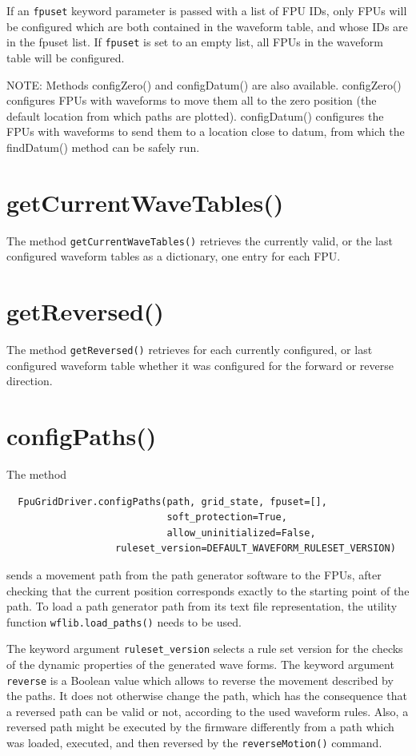 \documentclass[fontsize=12,a4paper]{scrreprt}
\begin{document}
If an \texttt{fpuset} keyword parameter is passed with a list of FPU
IDs, only FPUs will be configured which are both contained in the
waveform table, and whose IDs are in the fpuset list. If
\texttt{fpuset} is set to an empty list, all FPUs in the waveform
table will be configured.

NOTE: Methods configZero() and configDatum() are also available.
configZero() configures FPUs with waveforms to move them all to the
zero position (the default location from which paths are plotted).
configDatum() configures the FPUs with waveforms to send them to
a location close to datum, from which the findDatum() method can be
safely run. 

\section{getCurrentWaveTables()}
 The method
\texttt{getCurrentWaveTables()} retrieves the currently valid, or the
last configured waveform tables as a dictionary, one entry for each
FPU.


\section{getReversed()}
 The method \texttt{getReversed()}
retrieves for each currently configured, or last configured waveform
table whether it was configured for the forward or reverse direction.


\section{configPaths()}
\label{sec:configpaths}

The method
\begin{verbatim}
  FpuGridDriver.configPaths(path, grid_state, fpuset=[],
                            soft_protection=True,
                            allow_uninitialized=False,
                   ruleset_version=DEFAULT_WAVEFORM_RULESET_VERSION)
\end{verbatim}
sends a movement path from the path generator software to the FPUs,
after checking that the current position corresponds exactly to the
starting point of the path.  To load a path generator path from its
text file representation, the utility function
\texttt{wflib.load\_paths()} needs to be used.

The keyword argument \texttt{ruleset\_version} selects a rule set
version for the checks of the dynamic properties of the generated wave
forms. The keyword argument \texttt{reverse} is a Boolean value which
allows to reverse the movement described by the paths. It does not
otherwise change the path, which has the consequence that a reversed
path can be valid or not, according to the used waveform rules. Also,
a reversed path might be executed by the firmware differently from a
path which was loaded, executed, and then reversed by the
\texttt{reverseMotion()} command.
\end{document}
